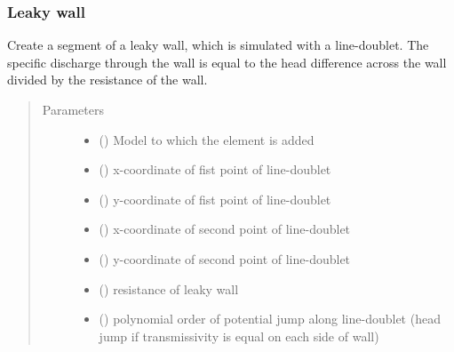 \documentclass[letterpaper,10pt,english]{sphinxmanual}
\begin{document}
\subsubsection{Leaky wall}
\label{\detokenize{linedoublets/leakylinedoublet:leaky-wall}}\label{\detokenize{linedoublets/leakylinedoublet::doc}}

\begin{fulllineitems}
\label{\detokenize{linedoublets/leakylinedoublet:timml.linedoublet.LeakyLineDoublet}}
Create a segment of a leaky wall, which is
simulated with a line-doublet. The specific discharge through
the wall is equal to the head difference across the wall
divided by the resistance of the wall.
\begin{quote}\begin{description}
\item[{Parameters}] \leavevmode\begin{itemize}
\item {} 
 () \textendash{} Model to which the element is added

\item {} 
 () \textendash{} x-coordinate of fist point of line-doublet

\item {} 
 () \textendash{} y-coordinate of fist point of line-doublet

\item {} 
 () \textendash{} x-coordinate of second point of line-doublet

\item {} 
 () \textendash{} y-coordinate of second point of line-doublet

\item {} 
 () \textendash{} resistance of leaky wall

\item {} 
 (\sphinxstyleliteralemphasis{ (}\sphinxstyleliteralemphasis{)}) \textendash{} polynomial order of potential jump along line-doublet
(head jump if transmissivity is equal on each side of wall)


\end{itemize}
\end{description}
\end{quote}
\end{fulllineitems}
\end{document}
